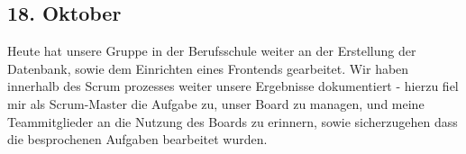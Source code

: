 \subsection{18. Oktober}
Heute hat unsere Gruppe in der Berufsschule weiter an der Erstellung der Datenbank, sowie dem Einrichten eines Frontends gearbeitet. Wir haben innerhalb des Scrum prozesses weiter unsere Ergebnisse dokumentiert - hierzu fiel mir als Scrum-Master die Aufgabe zu, unser Board zu managen, und meine Teammitglieder an die Nutzung des Boards zu erinnern, sowie sicherzugehen dass die besprochenen Aufgaben bearbeitet wurden.
